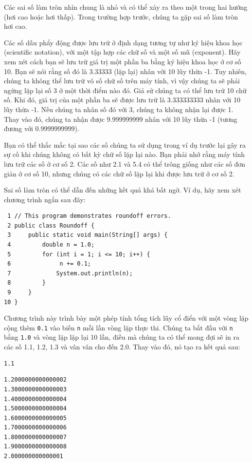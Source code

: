 Các sai số làm tròn nhìn chung là nhỏ và có thể xảy ra theo một trong
hai hướng (hơi cao hoặc hơi thấp). Trong trường hợp trước, chúng ta gặp
sai số làm tròn hơi cao.

Các số dấu phẩy động được lưu trữ ở định dạng tương tự như ký hiệu khoa
học (scientific notation), với một tập hợp các chữ số và một số mũ
(exponent). Hãy xem xét cách bạn sẽ lưu trữ giá trị một phần ba bằng ký
hiệu khoa học ở cơ số 10. Bạn sẽ nói rằng số đó là 3.33333 (lặp lại)
nhân với 10 lũy thừa -1. Tuy nhiên, chúng ta không thể lưu trữ vô số chữ
số trên máy tính, vì vậy chúng ta sẽ phải ngừng lặp lại số 3 ở một thời
điểm nào đó. Giả sử chúng ta có thể lưu trữ 10 chữ số. Khi đó, giá trị
của một phần ba sẽ được lưu trữ là 3.333333333 nhân với 10 lũy thừa -1.
Nếu chúng ta nhân số đó với 3, chúng ta không nhận lại được 1. Thay vào
đó, chúng ta nhận được 9.999999999 nhân với 10 lũy thừa -1 (tương đương
với 0.9999999999).

Bạn có thể thắc mắc tại sao các số chúng ta sử dụng trong ví dụ trước
lại gây ra sự cố khi chúng không có bất kỳ chữ số lặp lại nào. Bạn phải
nhớ rằng máy tính lưu trữ các số ở cơ số 2. Các số như 2.1 và 5.4 có thể
trông giống như các số đơn giản ở cơ số 10, nhưng chúng có các chữ số
lặp lại khi được lưu trữ ở cơ số 2.

Sai số làm tròn có thể dẫn đến những kết quả khá bất ngờ. Ví dụ, hãy xem
xét chương trình ngắn sau đây:

\begin{verbatim}
 1 // This program demonstrates roundoff errors.
 2 public class Roundoff {
 3     public static void main(String[] args) {
 4         double n = 1.0;
 5         for (int i = 1; i <= 10; i++) {
 6              n += 0.1;
 7             System.out.println(n);
 8         }
 9     }
10 }
\end{verbatim}

Chương trình này trình bày một phép tính tổng tích lũy cổ điển với một
vòng lặp cộng thêm \texttt{0.1} vào biến \texttt{n} mỗi lần vòng lặp
thực thi. Chúng ta bắt đầu với \texttt{n} bằng \texttt{1.0} và vòng lặp
lặp lại 10 lần, điều mà chúng ta có thể mong đợi sẽ in ra các số 1.1,
1.2, 1.3 và vân vân cho đến 2.0. Thay vào đó, nó tạo ra kết quả sau:

\begin{verbatim}
1.1 
\end{verbatim}

\begin{verbatim}
1.2000000000000002 
1.3000000000000003 
1.4000000000000004 
1.5000000000000004 
1.6000000000000005 
1.7000000000000006 
1.8000000000000007 
1.9000000000000008 
2.000000000000001
\end{verbatim}

